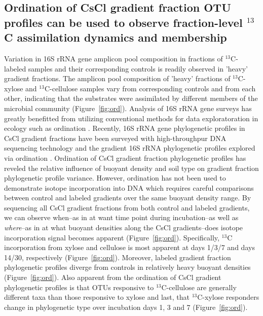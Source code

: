 \subsection{Ordination of CsCl gradient fraction OTU profiles can be used to
observe fraction-level $^{13}$C assimilation dynamics and membership}
Variation in 16S rRNA gene amplicon pool composition in fractions of
$^{13}$C-labeled samples and their corresponding controls is readily observed
in 'heavy' gradient fractions. The amplicon pool composition of 'heavy'
fractions of $^{13}$C-xylose and $^{13}$C-cellulose samples vary from
corresponding controls and from each other, indicating that the substrates were
assimilated by different members of the  microbial community (Figure~\ref{fig:ord}).
Analysis of 16S rRNA gene surveys has greatly benefitted from utilizing
conventional methods for data exploratoration in ecology such as ordination \citep{Lozupone_2008}. 
Recently, 16S rRNA gene phylogenetic profiles in CsCl gradient fractions have been surveyed
with high-throughpur DNA sequencing technology and the gradient 16S rRNA 
phylogenetic profiles explored via ordination \citep{Angel_2013, Verastegui_2014}. Ordination of CsCl gradient fraction
phylogenetic profiles has reveled the relative influence of buoyant density and 
soil type on gradient fraction phylogenetic profile variance. However, ordination
has not been used to demonstrate isotope incorporation into DNA which requires careful
comparisons between control and labeled gradients over the same buoyant density range. By
sequencing all CsCl gradient fractions from both control and labeled gradients, we can 
observe when--as in at want time point during incubation--as well as \textit{where}--as in
at what buoyant densities along the CsCl gradients--does isotope incorporation signal 
becomes apparent (Figure~\ref{fig:ord}). Specifically, $^{13}$C incorporation from xylose
and cellulose is most apparent at days 1/3/7 and days 14/30, respectively 
(Figure~\ref{fig:ord}). Moreover, labeled gradient fraction phylogenetic profiles diverge 
from controls in relatively heavy buoyant densities (Figure~\ref{fig:ord}). Also apparent
from the ordination of CsCl gradient phylogenetic profiles is that OTUs responsive to 
$^{13}$C-cellulose are generally different taxa than those responsive to xylose and last,
that $^{13}$C-xylose responders change in phylogenetic type over incubation
days 1, 3 and 7 (Figure~\ref{fig:ord}).

